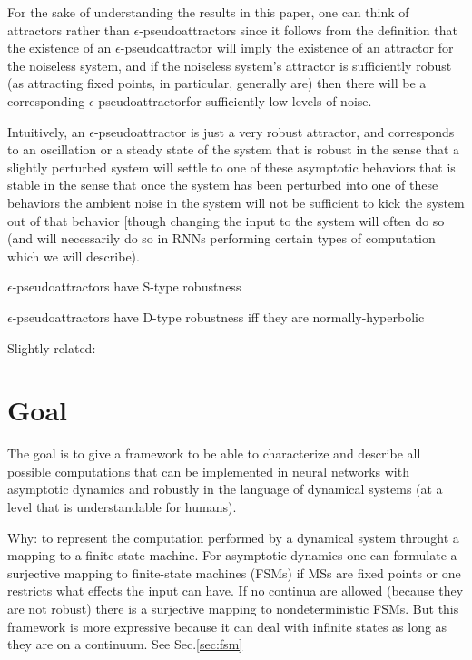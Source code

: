 \documentclass{scrartcl}
\theoremstyle{definition}
\theoremstyle{remark}
\begin{document}
For the sake of understanding the results in this paper, one can think of attractors rather than $\epsilon$-pseudoattractors since it follows from the definition that the existence of an $\epsilon$-pseudoattractor will imply the existence of an attractor for the noiseless system, and if the noiseless system's attractor is sufficiently robust (as attracting fixed points, in particular, generally are) then there will be a corresponding $\epsilon$-pseudoattractorfor sufficiently low levels of noise.

Intuitively, an $\epsilon$-pseudoattractor is just a very robust attractor, and corresponds to an oscillation or a steady state of the system that is robust in the sense that a slightly perturbed system will settle to one of these asymptotic behaviors that is stable in the sense that once the system has been perturbed into one of these behaviors the ambient noise in the system will not be sufficient to kick the system out of that behavior [though changing the input to the system will often do so (and will necessarily do so in RNNs performing certain types of computation which we will describe).

$\epsilon$-pseudoattractors have S-type robustness

$\epsilon$-pseudoattractors have D-type robustness iff they are normally-hyperbolic



Slightly related: 
\citep{cotteret2024vector}
\citep{oliva2019}





\section*{Goal}
The goal is to give a framework to be able to characterize and describe all possible computations that can be implemented in neural networks with asymptotic dynamics and robustly in the language of dynamical systems (at a level that is understandable for humans).

Why: to represent the computation performed by a dynamical system throught a mapping to a finite state machine.
For asymptotic dynamics one can formulate a surjective mapping to finite-state machines (FSMs) if MSs are fixed points or one restricts what effects the input can have.
If no continua are allowed (because they are not robust) there is a surjective mapping to nondeterministic FSMs. 
But this framework is more expressive because it can deal with infinite states as long as they are on a continuum.
See Sec.\ref{sec:fsm}
\end{document}
